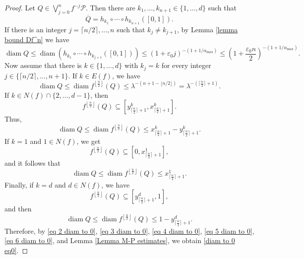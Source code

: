 \documentclass[12pt]{amsart}
\numberwithin{equation}{section} %
\numberwithin{figure}{section} %
\theoremstyle{plain}
\theoremstyle{definition}
\theoremstyle{remark}
\theoremstyle{citing}
\renewcommand{\=}{\coloneqq}
\DeclareMathOperator{\diam}{diam}
\begin{document}
\begin{proof}
    Let $Q\in \bigvee_{j=0}^{n}f^{-j}\mathcal{P}$. Then there are $k_1,\ldots,k_{n+1} \in\{1,\ldots,d\}$ such that  
    \begin{equation}
    \overline{Q}=h_{k_1}\circ\cdots\circ h_{k_{n+1}}([0,1]).
    \end{equation}
    If there is an integer $j = \lceil n/2 \rceil,\dots, n$ such that $k_{j}\neq k_{j+1}$, by Lemma \ref{lemma bound Df^n} we have
    \begin{equation}\label{eq 2 diam to 0}
        \diam Q \leq \diam (h_{k_1}\circ \cdots \circ h_{k_{j+1}}([0,1])) \leq (1+\varepsilon_0 j)^{-(1+1/\alpha_{\max})} \leq \left(1+\frac{\varepsilon_0 n}{2}\right)^{-(1+1/\alpha_{\max})}.
    \end{equation}
    Now assume that there is $k\in\{1,\ldots,d\}$ with $k_j=k$ for every integer $j\in \{\lceil n/2 \rceil,\dots,n+1\}$. If $k\in E(f)$, we have
    \begin{equation}\label{eq 3 diam to 0}
        \diam Q \leq \diam f^{\left\lfloor \frac{n}{2}\right\rfloor}(Q)\leq \lambda^{-(n+1-\lfloor n/2\rfloor)}=\lambda^{-(\lceil \frac{n}{2}\rceil+1)}.
    \end{equation}
    If $k\in N(f)\cap\{2,\ldots,d-1\}$, then
    \begin{equation*}
        f^{\left\lfloor \frac{n}{2}\right\rfloor}(Q) \subseteq \left[y_{\lceil \frac{n}{2}\rceil+1}^k, x_{\lceil \frac{n}{2}\rceil+1}^k\right].
    \end{equation*}
    Thus,
    \begin{equation}\label{eq 4 diam to 0}
       \diam Q \leq \diam f^{\left\lfloor \frac{n}{2}\right\rfloor}(Q) \leq  x_{\lceil \frac{n}{2}\rceil+1}^k - y_{\lceil \frac{n}{2}\rceil+1}^k.
    \end{equation}
    If $k = 1$ and $1\in N(f)$, we get
    \begin{equation*}
        f^{\left\lfloor \frac{n}{2}\right\rfloor}(Q) \subseteq \left[0,x_{\lceil \frac{n}{2}\rceil+1}^1\right],
    \end{equation*}
    and it follows that
    \begin{equation}\label{eq 5 diam to 0}
        \diam Q \leq \diam f^{\left\lfloor \frac{n}{2}\right\rfloor}(Q) \leq x_{\lceil \frac{n}{2}\rceil+1}^1.
    \end{equation}
    Finally, if $k = d $ and $d\in N(f)$, we have
    \begin{equation*}
        f^{\left\lfloor \frac{n}{2}\right\rfloor}(Q) \subseteq \left[y_{\lceil \frac{n}{2}\rceil+1}^d,1\right],
    \end{equation*}
    and then 
    \begin{equation}\label{eq 6 diam to 0}
        \diam Q \leq \diam f^{\left\lfloor \frac{n}{2}\right\rfloor}(Q) \leq 1-y_{\lceil \frac{n}{2}\rceil+1}^d.
    \end{equation}
    Therefore, by  \eqref{eq 2 diam to 0}, \eqref{eq 3 diam to 0}, \eqref{eq 4 diam to 0}, \eqref{eq 5 diam to 0}, \eqref{eq 6 diam to 0}, and Lemma \ref{Lemma M-P estimates}, we obtain \eqref{diam to 0 eq0}.
    \end{proof}
\end{document}
